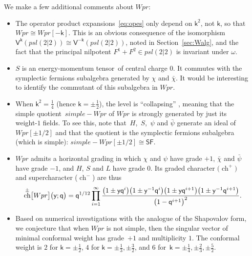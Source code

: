 \documentclass[10pt,a4paper]{amsart}
\numberwithin{equation}{section}
\newcommand{\bchi}{\bar{\chi}{}} %
\newcommand{\bpsi}{\bar{\psi}{}} %
\newcommand{\kk}{\mathsf{k}} %
\newcommand{\qq}{\mathsf{q}} %
\newcommand{\yy}{\mathsf{y}} %
\DeclarePairedDelimiter{\brac}{\lparen}{\rparen} %
\DeclarePairedDelimiter{\sqbrac}{\lbrack}{\rbrack} %
\newcommand{\alg}[1]{\mathfrak{#1}} %
\newcommand{\VOA}[1]{\mathsf{#1}} %
\newcommand{\SLSA}[3]{\alg{#1}_{#2 \vert #3}} %
\newcommand{\psl}{\SLSA{psl}{2}{2}}
\newcommand{\sfsymb}{\VOA{SF}}
\newcommand{\sfvoa}{\sfsymb} %
\newcommand{\uaff}[2]{\VOA{V}^{#1}(#2)} %
\newcommand{\upsl}[1][\kk]{\uaff{#1}{\psl}} %
\newcommand{\uwalg}[2]{\VOA{W}^{#1}_{\mathrm{#2}}} %
\newcommand{\swalg}[2]{\VOA{W}_{#1}^{\mathrm{#2}}} %
\newcommand{\upr}[1][\kk]{\uwalg{#1}{pr}} %
\newcommand{\spr}[1][\kk]{\swalg{#1}{pr}} %
\newcommand{\Gr}[1]{\sqbrac[\big]{#1}} %
\DeclareMathOperator{\chmap}{ch}
\newcommand{\gch}[1]{\chmap^{\pm} \Gr{#1}} %
\newcommand{\fgch}[2]{\gch{#1} \brac[\big]{#2}}
\newcommand{\emt}{energy-momentum tensor}
\newcommand{\ope}{operator product expansion}
\newcommand{\opes}{\ope s}
\def\smash#1{#1}
\def\psl{psl(2|2)}
\def\upr{Wpr}
\def\spr{simple-Wpr}
\begin{document}
We make a few additional comments about \smash{$\upr$}:
\begin{itemize}\itemsep=0pt
	\item The \opes\ \eqref{eq:opes} only depend on $\kk^2$, not $\kk$, so that $\upr \cong \upr[-\kk]$.
	This is an obvious consequence of the isomorphism $\upsl \cong \upsl[-\kk]$, noted in Section~\ref{sec:Walg}, and the fact that the principal nilpotent $F^1+F^2 \in \psl$ is invariant under $\omega$.
	\item $S$ is an \emt\ of central charge $0$.
	It commutes with the symplectic fermions subalgebra generated by $\chi$ and $\bchi$.
	It would be interesting to identify the commutant of this subalgebra in \smash{$\upr$}.
	\item When $\kk^2=\frac{1}{4}$ (hence $\kk=\pm\frac{1}{2}$), the level is ``collapsing'' \cite{AdaCon16}, meaning that the simple quotient~$\spr$ of \smash{$\upr$} is strongly generated by just its weight-$1$ fields.
	To see this, note that~$H$,~$S$,~$\psi$ and $\bpsi$ generate an ideal of \smash{$\upr[\pm1/2]$} and that the quotient is the symplectic fermions subalgebra (which is simple): \smash{$\spr[\pm1/2] \cong \sfvoa$}.
	\item \smash{$\upr$} admits a horizontal grading in which $\chi$ and $\psi$ have grade $+1$, $\bchi$ and $\bpsi$ have grade $-1$, and $H$, $S$ and $L$ have grade $0$.
	Its graded character $\big(\chmap^+\big)$ and supercharacter ($\chmap^-$) are thus
	\begin{gather} \label{eq:uprchar}
		\fgch{\upr}{\yy;\qq} = \qq^{1/12} \prod_{i=1}^{\infty} \frac{\big(1\pm\yy\qq^i\big)\big(1\pm\yy^{-1}\qq^i\big)\big(1\pm\yy\qq^{i+1}\big)\big(1\pm\yy^{-1}\qq^{i+1}\big)}{\big(1-\qq^{i+1}\big)^2}.
	\end{gather}
	\item Based on numerical investigations with the analogue of the Shapovalov form, we conjecture that when \smash{$\upr$} is not simple, then the singular vector of minimal conformal weight has grade~$+1$ and multiplicity $1$.
 The conformal weight is $2$ for $\kk=\pm\frac{1}{2}$, $4$ for $\kk=\pm\frac{1}{3}, \pm\frac{3}{2}$, and $6$ for~${\kk=\pm\frac{1}{4}, \pm\frac{2}{3}, \pm\frac{5}{2}}$.
\end{itemize}
\end{document}
